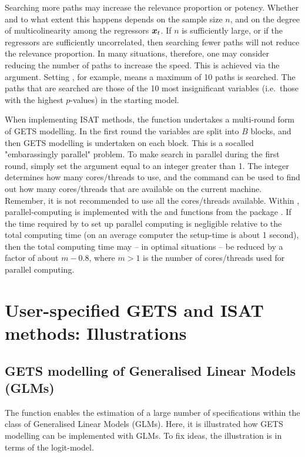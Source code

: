 Searching more paths may increase the relevance proportion or potency. Whether and to what extent this happens depends on the sample size $n$, and on the degree of multicolinearity among the regressors $\boldsymbol{x}_t$. If $n$ is sufficiently large, or if the regressors are sufficiently uncorrelated, then searching fewer paths will not reduce the relevance proportion. In many situations, therefore, one may consider reducing the number of paths to increase the speed. This is achieved via the  argument. Setting , for example, means a maximum of 10 paths is searched. The paths that are searched are those of the 10 most insignificant variables (i.e.\ those with the highest $p$-values) in the starting model.

When implementing ISAT methods, the function  undertakes a multi-round form of GETS modelling. In the first round the variables are split into $B$ blocks, and then GETS modelling is undertaken on each block. This is a socalled "embarassingly parallel" problem. To make  search in parallel during the first round, simply set the argument  equal to an integer greater than 1. The integer determines how many cores/threads to use, and the command  can be used to find out how many cores/threads that are available on the current machine. Remember, it is not recommended to use all the cores/threads available. Within , parallel-computing is implemented with the  and  functions from the package . If the time required by  to set up parallel computing is negligible relative to the total computing time (on an average computer the setup-time is about 1 second), then the total computing time may -- in optimal situations -- be reduced by a factor of about $m-0.8$, where $m>1$ is the number of cores/threads used for parallel computing.

\section{User-specified GETS and ISAT methods: Illustrations}

\subsection{GETS modelling of Generalised Linear Models (GLMs)}

The function  enables the estimation of a large number of specifications within the class of Generalised Linear Models (GLMs). Here, it is illustrated how GETS modelling can be implemented with GLMs. To fix ideas, the illustration is in terms of the logit-model.

